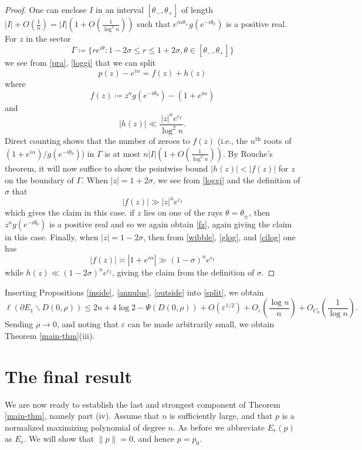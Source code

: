\documentclass[12pt]{amsart}
\newcommand{\eps}{\varepsilon}
\begin{document}
\begin{proof}
One can enclose $I$ in an interval $[\theta_-, \theta_+]$ of length $|I| + O\left(\frac{1}{n} \right) = |I| \left( 1 + O\left(\frac{1}{\log^2 n} \right) \right)$ such that $e^{in\theta_\pm} g(e^{-i\theta_0})$ is a positive real.  For $z$ in the sector
$$\Gamma \coloneqq \{re^{i\theta}: 1-2\sigma \leq r \leq 1+2\sigma, \theta \in [\theta_-, \theta_+] \}$$
we see from \eqref{pra}, \eqref{loggi} that we can split
$$ p(z) - e^{i\alpha} = f(z) + h(z)$$
where
$$ f(z) \coloneqq z^n g(e^{-i\theta_0}) - (1+e^{i\alpha})$$
and
$$ |h(z)| \ll \frac{|z|^n e^{c_I}}{\log^2 n}.$$
Direct counting shows that the number of zeroes to $f(z)$ (i.e., the $n^{\mathrm{th}}$ roots of $(1+e^{i\alpha}) / g(e^{-i\theta_0})$) in $\Gamma$ is at most $n|I| \left( 1 + O\left( \frac{1}{\log^2 n} \right) \right)$.  By Rouche's theorem, it will now suffice to show the pointwise bound $|h(z)| < |f(z)|$ for $z$ on the boundary of $\Gamma$.  When $|z| = 1 + 2\sigma$, we see from \eqref{loggi} and the definition of $\sigma$ that
\begin{equation}\label{fz}
    |f(z)| \gg |z|^n e^{c_I}
\end{equation}
which gives the claim in this case.  if $z$ lies on one of the rays $\theta = \theta_\pm$, then $z^n g(e^{-i\theta_0})$ is a positive real and so we again obtain \eqref{fz}, again giving the claim in this case.  Finally, when $|z| = 1 - 2\sigma$, then from \eqref{wibble}, \eqref{glog}, and \eqref{cilog} one has
$$ |f(z)| \asymp |1+e^{i\alpha}| \gg (1-\sigma)^n e^{c_I}$$
while $h(z) \ll (1-2\sigma)^n e^{c_I}$, giving the claim from the definition of $\sigma$.
\end{proof}

Inserting Propositions \ref{inside}, \ref{annulus}, \ref{outside} into \eqref{split}, we obtain
\begin{equation}\label{dip}
 \ell(\partial E_1 \backslash D(0,\rho)) \leq 2n + 4 \log 2 - \Psi(D(0,\rho)) + O(\eps^{1/2}) + O_\eps\left(\frac{\log n}{n} \right) + O_{C_0}\left( \frac{1}{\log n} \right).
\end{equation}
Sending $\rho \to 0$, and noting that $\eps$ can be made arbitrarily small, we obtain Theorem \ref{main-thm}(iii).

\section{The final result}\label{main-iv-sec}

We are now ready to establish the last and strongest component of Theorem \ref{main-thm}, namely part (iv).  Assume that $n$ is sufficiently large, and that $p$ is a normalized maximizing polynomial of degree $n$.  As before we abbreviate $E_r(p)$ as $E_r$. We will show that $\|p\|=0$, and hence $p = p_0$.
\end{document}
